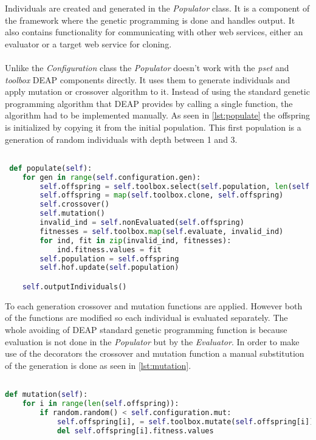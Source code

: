 Individuals are created and generated in the \textit{Populator} class. It is a component of the framework where
the genetic programming is done and handles output. It also contains functionality for communicating with other
web services, either an evaluator or a target web service for cloning.
\paragraph{}
Unlike the \textit{Configuration} class the \textit{Populator} doesn't work with the \textit{pset} and \textit{toolbox} DEAP
components directly. It uses them to generate individuals and apply mutation or crossover algorithm to it. Instead of using
the standard genetic programming algorithm that DEAP provides by calling a single function, the algorithm had to be implemented 
manually. As seen in \ref{lst:populate} the offspring is initialized by copying it from the initial population. This first population is a
generation of random individuals with depth between 1 and 3. 

\begin{lstlisting}[language=Python,caption={Populate function responsible for generating individuals},label={lst:populate}]

 def populate(self):
    for gen in range(self.configuration.gen):
        self.offspring = self.toolbox.select(self.population, len(self.population))
        self.offspring = map(self.toolbox.clone, self.offspring)
        self.crossover()
        self.mutation()
        invalid_ind = self.nonEvaluated(self.offspring)
        fitnesses = self.toolbox.map(self.evaluate, invalid_ind)
        for ind, fit in zip(invalid_ind, fitnesses):
            ind.fitness.values = fit
        self.population = self.offspring
        self.hof.update(self.population)

    self.outputIndividuals()
\end{lstlisting}

To each generation crossover and mutation functions are applied. However both of the functions are modified so each
individual is evaluated separately. The whole avoiding of DEAP standard genetic programming function is because evaluation
is not done in the \textit{Populator} but by the \textit{Evaluator}. In order to make use of the decorators the crossover
and mutation function a manual substitution of the generation is done as seen in \ref{lst:mutation}.

\begin{lstlisting}[language=Python,caption={Modified mutation method to substitute each parent with its children},label={lst:populate}]

def mutation(self):
    for i in range(len(self.offspring)):
        if random.random() < self.configuration.mut:
            self.offspring[i], = self.toolbox.mutate(self.offspring[i])
            del self.offspring[i].fitness.values
\end{lstlisting}